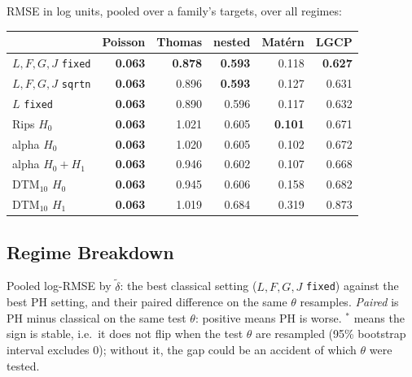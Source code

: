 \documentclass[11pt]{article}
\newcommand{\dt}{\tilde\delta}
\begin{document}
RMSE in log units, pooled over a family's targets, over all regimes:

\smallskip
\begin{tabular}{@{}lrrrrr@{}}
\toprule
 & Poisson & Thomas & nested & Mat\'ern & LGCP \\
\midrule
$L,F,G,J$ \texttt{fixed} & \textbf{0.063} & \textbf{0.878} & \textbf{0.593} & 0.118 & \textbf{0.627} \\
$L,F,G,J$ \texttt{sqrtn} & \textbf{0.063} & 0.896 & \textbf{0.593} & 0.127 & 0.631 \\
$L$ \texttt{fixed}       & \textbf{0.063} & 0.890 & 0.596 & 0.117 & 0.632 \\
Rips $H_0$               & \textbf{0.063} & 1.021 & 0.605 & \textbf{0.101} & 0.671 \\
alpha $H_0$              & \textbf{0.063} & 1.020 & 0.605 & 0.102 & 0.672 \\
alpha $H_0{+}H_1$        & \textbf{0.063} & 0.946 & 0.602 & 0.107 & 0.668 \\
DTM$_{10}$ $H_0$         & \textbf{0.063} & 0.945 & 0.606 & 0.158 & 0.682 \\
DTM$_{10}$ $H_1$         & \textbf{0.063} & 1.019 & 0.684 & 0.319 & 0.873 \\
\bottomrule
\end{tabular}

\subsection*{Regime Breakdown}
Pooled log-RMSE by $\dt$: the best classical setting ($L,F,G,J$ \texttt{fixed}) 
against the best PH setting, and their paired difference on the same $\theta$ resamples. 
\emph{Paired} is PH minus classical on the same test $\theta$: positive means PH is worse.
$^\ast$ means the sign is stable, i.e.\ it does not flip when the test $\theta$ are resampled (95\% bootstrap interval excludes $0$); without it,
the gap could be an accident of which $\theta$ were tested.
\end{document}
